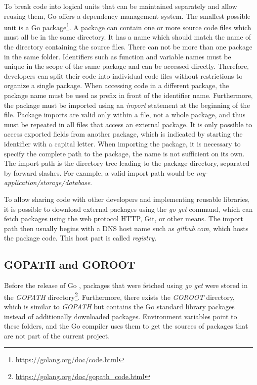 To break code into logical units that can be maintained separately and allow reusing them, Go offers a dependency
management system.
The smallest possible unit is a Go package\footnote{\url{https://golang.org/doc/code.html}}.
A package can contain one or more source code files which must all be in the same directory.
It has a name which should match the name of the directory containing the source files.
There can not be more than one package in the same folder.
Identifiers such as function and variable names must be unique in the scope of the same package and can be accessed
directly.
Therefore, developers can split their code into individual code files without restrictions to organize a single package.
When accessing code in a different package, the package name must be used as prefix in front of the identifier name.
Furthermore, the package must be imported using an \textit{import} statement at the beginning of the file.
Package imports are valid only within a file, not a whole package, and thus must be repeated in all files that access
an external package.
It is only possible to access exported fields from another package, which is indicated by starting the identifier with
a capital letter.
When importing the package, it is necessary to specify the complete path to the package, the name is not sufficient on
its own.
The import path is the directory tree leading to the package directory, separated by forward slashes.
For example, a valid import path would be \textit{my-application/storage/database}.

To allow sharing code with other developers and implementing reusable libraries, it is possible to download external
packages using the \textit{go get} command, which can fetch packages using the web protocol \acrshort{HTTP}, Git, or
other means.
The import path then usually begins with a \acrshort{DNS} host name such as \textit{github.com}, which hosts the package
code.
This host part is called \textit{registry}.



\subsection{GOPATH and GOROOT}\label{subsec:background:dependencies:gopath}

Before the release of Go , packages that were fetched using \textit{go get} were stored in the
\textit{GOPATH} directory\footnote{\url{https://golang.org/doc/gopath_code.html}}.
Furthermore, there exists the \textit{GOROOT} directory, which is similar to \textit{GOPATH} but contains the Go
standard library packages instead of additionally downloaded packages.
Environment variables point to these folders, and the Go compiler uses them to get the sources of packages that are not
part of the current project.

